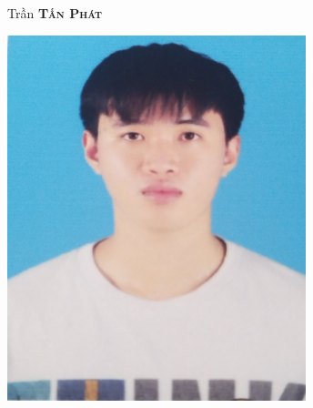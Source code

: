 \documentclass[11pt, a4paper]{article}
\begin{document}
\setlength{\topskip}{0pt}
\setlength{\parindent}{0pt}
\setlength{\parskip}{0pt}
\setlength{\fboxsep}{0pt}
\pagestyle{empty}
\raggedbottom

\begin{minipage}[t]{0.33\textwidth} %
\colorbox{cvblue}{\begin{minipage}[t][5mm][t]{\textwidth}\null\hfill\null\end{minipage}}

\vspace{-.2ex} %
\colorbox{cvblue!90}{\color{white}  %
\textwidth\relax%
\begin{minipage}[t][293mm][t]{0.82\textwidth}
\raggedright
\vspace*{2.5ex}

\Large Trần \textbf{\textsc{Tấn Phát}} \normalsize 

\null\hfill\includegraphics[width=0.65\textwidth]{Trần Tấn Phát.jpg}\hfill\null


\end{minipage}}
\end{minipage}
\end{document}
